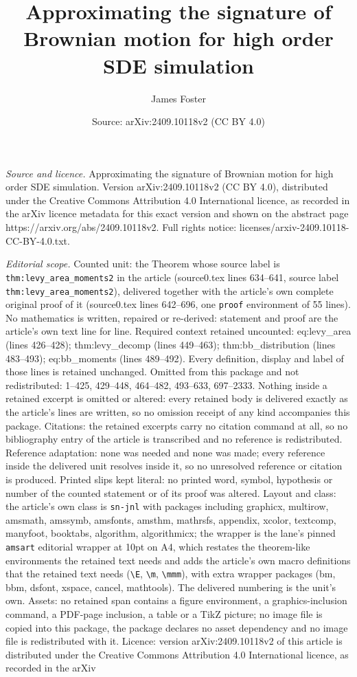 \documentclass[10pt,a4paper]{amsart}
\title[Approximating the signature of Brownian motion for high orde]{Approximating the signature of Brownian motion for high order SDE simulation}
\author{James Foster}
\date{Source: arXiv:2409.10118v2 (CC BY 4.0)}
\begin{document}
\maketitle

\noindent\emph{Source and licence.} Approximating the signature of Brownian motion for high order SDE simulation. Version arXiv:2409.10118v2 (CC BY 4.0), distributed under the Creative Commons Attribution 4.0 International licence, as recorded in the arXiv licence metadata for this exact version and shown on the abstract page https://arxiv.org/abs/2409.10118v2. Full rights notice: licenses/arxiv-2409.10118-CC-BY-4.0.txt.\par\smallskip

\noindent\textit{Editorial scope.} Counted unit: the Theorem whose source label is \texttt{thm:levy\_area\_moments2} in the article (source0.tex lines 634--641, source label \texttt{thm:levy\_area\_moments2}), delivered together with the article's own complete original proof of it (source0.tex lines 642--696, one \texttt{proof} environment of 55 lines). No mathematics is written, repaired or re-derived: statement and proof are the article's own text line for line. Required context retained uncounted: eq:levy\_area (lines 426--428); thm:levy\_decomp (lines 449--463); thm:bb\_distribution (lines 483--493); eq:bb\_moments (lines 489--492). Every definition, display and label of those lines is retained unchanged. Omitted from this package and not redistributed: 1--425, 429--448, 464--482, 493--633, 697--2333. Nothing inside a retained excerpt is omitted or altered: every retained body is delivered exactly as the article's lines are written, so no omission receipt of any kind accompanies this package. Citations: the retained excerpts carry no citation command at all, so no bibliography entry of the article is transcribed and no reference is redistributed. Reference adaptation: none was needed and none was made; every reference inside the delivered unit resolves inside it, so no unresolved reference or citation is produced. Printed slips kept literal: no printed word, symbol, hypothesis or number of the counted statement or of its proof was altered. Layout and class: the article's own class is \texttt{sn-jnl} with packages including graphicx, multirow, amsmath, amssymb, amsfonts, amsthm, mathrsfs, appendix, xcolor, textcomp, manyfoot, booktabs, algorithm, algorithmicx; the wrapper is the lane's pinned \texttt{amsart} editorial wrapper at 10pt on A4, which restates the theorem-like environments the retained text needs and adds the article's own macro definitions that the retained text needs (\texttt{\textbackslash E}, \texttt{\textbackslash m}, \texttt{\textbackslash mmm}), with extra wrapper packages (bm, bbm, dsfont, xspace, cancel, mathtools). The delivered numbering is the unit's own. Assets: no retained span contains a figure environment, a graphics-inclusion command, a PDF-page inclusion, a table or a TikZ picture; no image file is copied into this package, the package declares no asset dependency and no image file is redistributed with it. Licence: version arXiv:2409.10118v2 of this article is distributed under the Creative Commons Attribution 4.0 International licence, as recorded in the arXiv 
\end{document}
